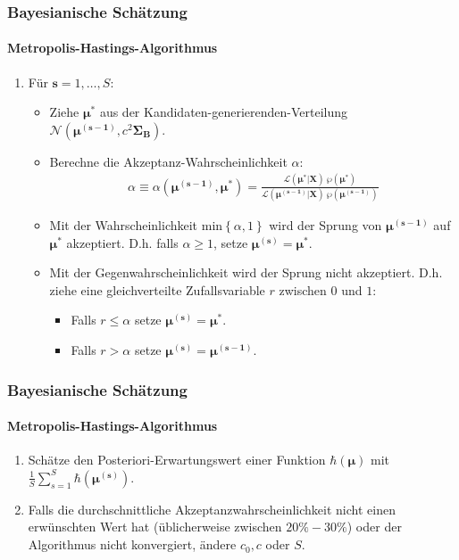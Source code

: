 \documentclass{beamer} %
\newcounter{saveenumi}
\newcommand{\seti}{\setcounter{saveenumi}{\value{enumi}}}
\newcommand{\conti}{\setcounter{enumi}{\value{saveenumi}}}
\begin{document}
\begin{frame}\frametitle{Bayesianische Sch\"{a}tzung}\framesubtitle{Metropolis-Hastings-Algorithmus}
\begin{enumerate}\conti
  \item F\"{u}r $\mathbf{s}=1,\dots,S$:
  \begin{itemize}
    \item Ziehe $\boldsymbol{\mu^*}$ aus der
        Kandidaten-generierenden-Verteilung
        $\mathcal{N}(\boldsymbol{\mu^{(s-1)}},c^2\boldsymbol{\Sigma_B})$.
    \item Berechne die Akzeptanz-Wahrscheinlichkeit $\alpha$:
        \begin{align*}
        \alpha \equiv \alpha\left(\boldsymbol{\mu^{(s-1)}},\boldsymbol{\mu^*}\right) = \frac{\mathcal{L}\left(\boldsymbol{\mu^{*}}|\mathbf{X}\right)~\wp\left(\boldsymbol{\mu^*}\right)}{\mathcal{L}\left(\boldsymbol{\mu^{(s-1)}}|\mathbf{X}\right)~\wp\left(\boldsymbol{\mu^{(s-1)}}\right)}
        \end{align*}
    \item Mit der Wahrscheinlichkeit
        $\text{min}\left\{\alpha,1\right\}$ wird der Sprung von
        $\boldsymbol{\mu^{(s-1)}}$ auf $\boldsymbol{\mu^*}$
        akzeptiert. D.h. falls $\alpha\geq1$, setze
        $\boldsymbol{\mu^{(s)}}=\boldsymbol{\mu^*}$.
    \item Mit der Gegenwahrscheinlichkeit wird der Sprung nicht
        akzeptiert. D.h. ziehe eine gleichverteilte Zufallsvariable $r$ zwischen $0$ und $1$:
        \begin{itemize}
        \item Falls $r\leq\alpha$ setze $\boldsymbol{\mu^{(s)}}=\boldsymbol{\mu^*}$.
        \item Falls $r>\alpha$ setze $\boldsymbol{\mu^{(s)}}=\boldsymbol{\mu^{(s-1)}}$.
         \end{itemize}
  \end{itemize}
\seti
\end{enumerate}

\end{frame}

\begin{frame}\frametitle{Bayesianische Sch\"{a}tzung}\framesubtitle{Metropolis-Hastings-Algorithmus}
\begin{enumerate}\conti
  \item Sch\"{a}tze den Posteriori-Erwartungswert einer Funktion
      $\hbar(\boldsymbol{\mu})$ mit $\frac{1}{S}\sum_{s=1}^S
      \hbar\left(\boldsymbol{\mu^{(s)}}\right)$.
  \item Falls die durchschnittliche Akzeptanzwahrscheinlichkeit nicht
      einen erw\"{u}nschten Wert hat (\"{u}blicherweise zwischen $20\%-30\%$) oder der Algorithmus nicht konvergiert,
\"{a}ndere $c_0,c$ oder $S$.
\end{enumerate}

\end{frame}
\end{document}
